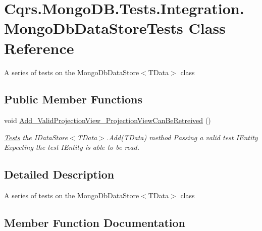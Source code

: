 \hypertarget{classCqrs_1_1MongoDB_1_1Tests_1_1Integration_1_1MongoDbDataStoreTests}{}\section{Cqrs.\+Mongo\+D\+B.\+Tests.\+Integration.\+Mongo\+Db\+Data\+Store\+Tests Class Reference}
\label{classCqrs_1_1MongoDB_1_1Tests_1_1Integration_1_1MongoDbDataStoreTests}


A series of tests on the Mongo\+Db\+Data\+Store$<$\+T\+Data$>$ class  


\subsection*{Public Member Functions}
\begin{DoxyCompactItemize}
\item 
void \hyperlink{classCqrs_1_1MongoDB_1_1Tests_1_1Integration_1_1MongoDbDataStoreTests_abc75ba3ce42446bfb19c32a3eee3ebae_abc75ba3ce42446bfb19c32a3eee3ebae}{Add\+\_\+\+Valid\+Projection\+View\+\_\+\+Projection\+View\+Can\+Be\+Retreived} ()
\begin{DoxyCompactList}\small\item\em \hyperlink{namespaceCqrs_1_1MongoDB_1_1Tests}{Tests} the I\+Data\+Store$<$\+T\+Data$>$.\+Add(\+T\+Data) method Passing a valid test I\+Entity Expecting the test I\+Entity is able to be read. \end{DoxyCompactList}\end{DoxyCompactItemize}


\subsection{Detailed Description}
A series of tests on the Mongo\+Db\+Data\+Store$<$\+T\+Data$>$ class 



\subsection{Member Function Documentation}
\mbox{\label{classCqrs_1_1MongoDB_1_1Tests_1_1Integration_1_1MongoDbDataStoreTests_abc75ba3ce42446bfb19c32a3eee3ebae_abc75ba3ce42446bfb19c32a3eee3ebae}} 
